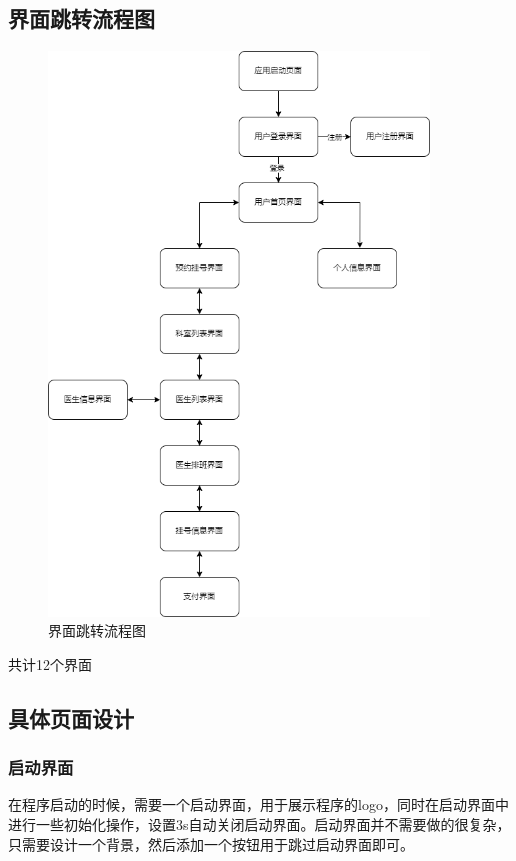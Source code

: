 \documentclass[UTF8,12pt]{article}
\begin{document}
\subsection{界面跳转流程图}
\begin{figure}[htbp]
    \centering
    \includegraphics[width=0.9\textwidth]{imgs/1.png}
    \caption{界面跳转流程图}
    \label{fig:flowchart}
\end{figure}

\newpage

共计12个界面

\subsection{具体页面设计}
\subsubsection{启动界面}
在程序启动的时候，需要一个启动界面，用于展示程序的logo，同时在启动界面中进行一些初始化操作，设置3s自动关闭启动界面。启动界面并不需要做的很复杂，只需要设计一个背景，然后添加一个按钮用于跳过启动界面即可。
\end{document}
